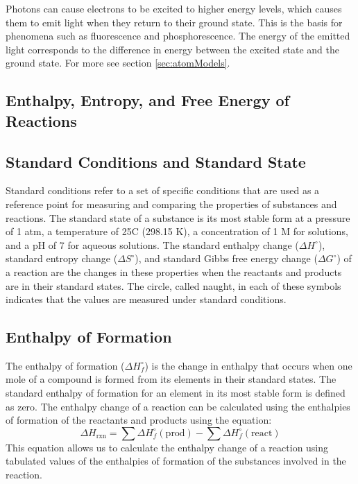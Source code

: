 Photons can cause electrons to be excited to higher energy levels, which causes them to emit light when they return to their ground state. This is the basis for phenomena such as fluorescence and phosphorescence. The energy of the emitted light corresponds to the difference in energy between the excited state and the ground state. For more see section \ref{sec:atomModels}.

\subsection{Enthalpy, Entropy, and Free Energy of Reactions}
\subsection{Standard Conditions and Standard State}
Standard conditions refer to a set of specific conditions that are used as a reference point for measuring and comparing the properties of substances and reactions. The standard state of a substance is its most stable form at a pressure of 1 atm, a temperature of 25\textdegree C (298.15 K), a concentration of 1 M for solutions, and a pH of 7 for aqueous solutions. The standard enthalpy change ($\Delta H^\circ$), standard entropy change ($\Delta S^\circ$), and standard Gibbs free energy change ($\Delta G^\circ$) of a reaction are the changes in these properties when the reactants and products are in their standard states. The circle, called naught, in each of these symbols indicates that the values are measured under standard conditions. 
\subsection{Enthalpy of Formation}
The enthalpy of formation ($\Delta H_f^\circ$) is the change in enthalpy that occurs when one mole of a compound is formed from its elements in their standard states. The standard enthalpy of formation for an element in its most stable form is defined as zero. The enthalpy change of a reaction can be calculated using the enthalpies of formation of the reactants and products using the equation:
\begin{equation}\label{eq:enthalpy_of_formation}
    \Delta H_\text{rxn} = \sum \Delta H_f^\circ(\text{prod}) - \sum \Delta H_f^\circ (\text{react})
\end{equation}
This equation allows us to calculate the enthalpy change of a reaction using tabulated values of the enthalpies of formation of the substances involved in the reaction.
